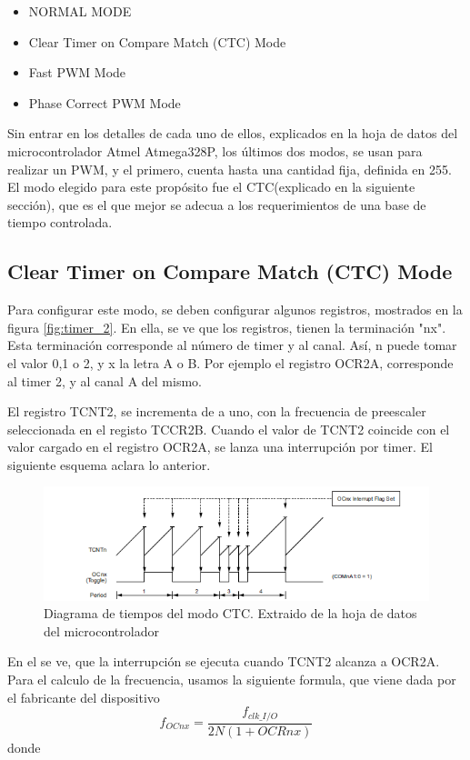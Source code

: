 \begin{itemize}
	\item NORMAL MODE 
	\item Clear Timer on Compare Match (CTC) Mode
	\item Fast PWM Mode 
	\item Phase Correct PWM Mode
\end{itemize}

Sin entrar en los detalles de cada uno de ellos, explicados en la hoja de datos del microcontrolador Atmel Atmega328P, los últimos dos modos, se usan para realizar un PWM, y el primero, cuenta hasta una cantidad fija, definida en 255. El modo elegido para este propósito fue el CTC(explicado en la siguiente sección), que es el que mejor se adecua a los requerimientos de una base de tiempo controlada. 

\subsection{Clear Timer on Compare Match (CTC) Mode }

Para configurar este modo, se deben configurar algunos registros, mostrados en la figura \ref{fig:timer_2}. En ella, se ve que los registros, tienen la terminación "nx". Esta terminación corresponde al número de timer y al canal. Así, n puede tomar el valor 0,1 o 2, y x la letra A o B. Por ejemplo el registro OCR2A, corresponde al timer 2, y al canal A del mismo. 
 
El registro TCNT2, se incrementa de a uno, con la frecuencia de preescaler seleccionada en el registo TCCR2B. Cuando el valor de TCNT2 coincide con el valor cargado en el registro OCR2A, se lanza una interrupción por timer. El siguiente esquema aclara lo anterior. 

\begin{figure}[ht]
	\includegraphics{ctc_t2} 
	\caption{Diagrama de tiempos del modo CTC. Extraido de la hoja de datos del microcontrolador}
	\label{fig:ctc_isr}
\end{figure}

En el se ve, que la interrupción se ejecuta cuando TCNT2 alcanza a OCR2A. Para el calculo de la frecuencia, usamos la siguiente formula, que viene dada por el fabricante del dispositivo
\begin{equation} \label{eq:frec_clk_isr2}
	f_{OCnx} = \frac{f_{clk \_ I/O}}{2N(1+OCRnx)}
\end{equation}
donde 

